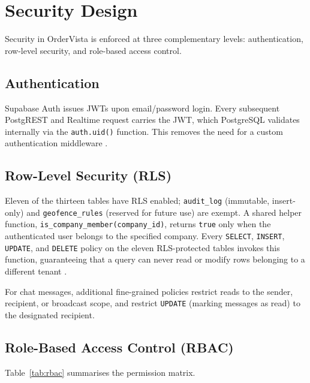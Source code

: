 \section{Security Design}
\label{sec:security}

Security in OrderVista is enforced at three complementary levels:
authentication, row-level security, and role-based access control.

\subsection{Authentication}
\label{sec:authn}

Supabase Auth issues JWTs upon email/password login.  Every subsequent
PostgREST and Realtime request carries the JWT, which PostgreSQL validates
internally via the \texttt{auth.uid()} function.  This removes the need for
a custom authentication middleware \autocite{supabase2026docs}.

\subsection{Row-Level Security (RLS)}
\label{sec:rls}

Eleven of the thirteen tables have RLS enabled; \texttt{audit\_log}
(immutable, insert-only) and \texttt{geofence\_rules} (reserved for future
use) are exempt.  A shared helper function,
\texttt{is\_company\_member(company\_id)}, returns \texttt{true} only when the
authenticated user belongs to the specified company.  Every \texttt{SELECT},
\texttt{INSERT}, \texttt{UPDATE}, and \texttt{DELETE} policy on the eleven
RLS-protected tables invokes this function, guaranteeing that a query can
never read or modify rows belonging to a different tenant
\autocite{postgresql2026rls,aws2020rls}.

For chat messages, additional fine-grained policies restrict reads to the
sender, recipient, or broadcast scope, and restrict \texttt{UPDATE} (marking
messages as read) to the designated recipient.

\subsection{Role-Based Access Control (RBAC)}
\label{sec:rbac}

Table~\ref{tab:rbac} summarises the permission matrix.


